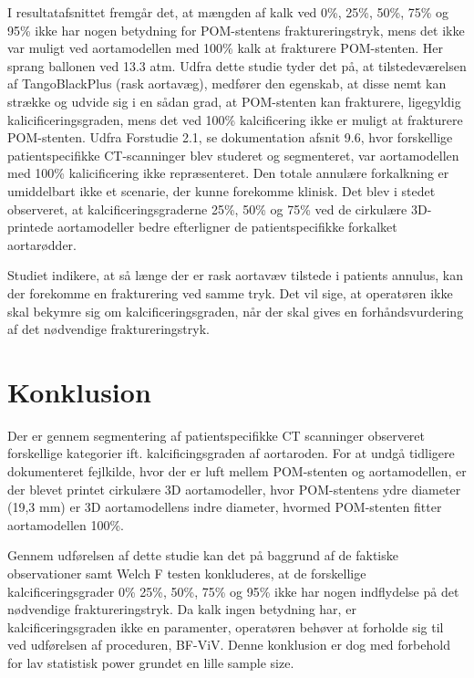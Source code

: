 I resultatafsnittet fremgår det, at mængden af kalk ved 0\%, 25\%, 50\%, 75\% og 95\% ikke har nogen betydning for POM-stentens fraktureringstryk, mens det ikke var muligt ved aortamodellen med 100\% kalk at frakturere POM-stenten. Her sprang ballonen ved 13.3 atm. Udfra dette studie tyder det på, at tilstedeværelsen af TangoBlackPlus (rask aortavæg), medfører den egenskab, at disse nemt kan strække og udvide sig i en sådan grad, at POM-stenten kan frakturere, ligegyldig kalicificeringsgraden, mens det ved 100\% kalcificering ikke er muligt at frakturere POM-stenten. Udfra Forstudie 2.1, se dokumentation afsnit 9.6, hvor forskellige patientspecifikke CT-scanninger blev studeret og segmenteret, var aortamodellen med 100\% kalicificering ikke repræsenteret. Den totale annulære forkalkning er umiddelbart ikke et scenarie, der kunne forekomme klinisk. Det blev i stedet observeret, at kalcificeringsgraderne 25\%, 50\% og 75\% ved de cirkulære 3D-printede aortamodeller bedre efterligner de patientspecifikke forkalket aortarødder.

Studiet indikere, at så længe der er rask aortavæv tilstede i patients annulus, kan der forekomme en frakturering ved samme tryk. Det vil sige, at operatøren ikke skal bekymre sig om kalcificeringsgraden, når der skal gives en forhåndsvurdering af det nødvendige fraktureringstryk. 

\section{Konklusion}  
Der er gennem segmentering af patientspecifikke CT scanninger observeret forskellige kategorier ift. kalcificingsgraden af aortaroden. For at undgå tidligere dokumenteret fejlkilde, hvor der er luft mellem POM-stenten og aortamodellen, er der blevet printet cirkulære 3D aortamodeller, hvor POM-stentens ydre diameter (19,3 mm) er 3D aortamodellens indre diameter, hvormed POM-stenten fitter aortamodellen 100\%.  

Gennem udførelsen af dette studie kan det på baggrund af de faktiske observationer samt Welch F testen konkluderes, at de forskellige kalcificeringsgrader 0\% 25\%, 50\%, 75\% og 95\% ikke har nogen indflydelse på det nødvendige fraktureringstryk. Da kalk ingen betydning har, er kalcificeringsgraden ikke en paramenter, operatøren behøver at forholde sig til ved udførelsen af proceduren, BF-ViV. Denne konklusion er dog med forbehold for lav statistisk power grundet en lille sample size.  

